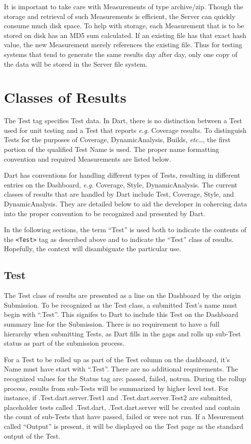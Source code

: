 \documentclass{InsightBook}
\newcommand{\xmltag}[1]{\texttt{<#1>}}
\begin{document}
It is important to take care with Measurements of type archive/zip.
Though the storage and retrieval of such Measurements is efficient,
the Server can quickly consume much disk space.  To help with storage,
each Measurement that is to be stored on disk has an MD5 sum
calculated.  If an existing file has that exact hash value, the new
Measurement merely references the existing file.  Thus for testing
systems that tend to generate the same results day after day, only one
copy of the data will be stored in the Server file system.

\section{Classes of Results}
The Test tag specifies Test data.  In Dart, there is no
distinction between a Test used for unit testing and a Test that
reports \emph{e.g.} Coverage results.  To distinguish Tests for the
purposes of Coverage, DynamicAnalysis, Builds, \emph{etc}\ldots, the
first portion of the qualified Test Name is used.  The proper name
formatting convention and required Measurements are listed below.

Dart has conventions for handling different types of Tests, resulting
in different entries on the Dashboard, \emph{e.g.} Coverage, Style,
DynamicAnalysis.  The current classes of results that are handled by
Dart include Test, Coverage, Style, and DynamicAnalysis.  They are
detailed below to aid the developer in cohercing data into the proper
convention to be recognized and presented by Dart.

In the following sections, the term ``Test'' is used both to indicate
the contents of the \xmltag{Test} tag as described above and to indicate
the ``Test'' class of results.  Hopefully, the context will
disambiguate the particular use.

\subsection{Test}
The Test class of results are presented as a line on the Dashboard by
the origin Submission.  To be recognized as the Test class, a
submitted Test's name must begin with ``.Test''.  This signifes to
Dart to include this Test on the Dashboard summary line for the
Submission.  There is no requirement to have a full hierarchy when
submitting Tests, as Dart fills in the gaps and rolls up sub-Test
status as part of the submission process.

For a Test to be rolled up as part of the Test column on the
dashboard, it's Name must have start with ``.Test''.  There are no
additional requirements.  The recognized values for the Status tag
are: passed, failed, notrun.  During the rollup process, results from
sub-Tests will be summarized by higher level test.  For instance, if
.Test.dart.server.Test1 and .Test.dart.server.Test2 are submitted, 
placeholder tests called .Test.dart, .Test.dart.server will be created
and contain the count of sub-Tests that have passed, failed or were
not run.  If a Mesurement called ``Output'' is present, it will be
displayed on the Test page as the standard output of the Test.
\end{document}
